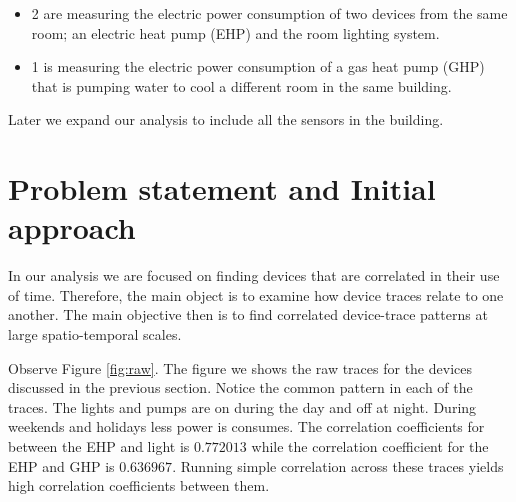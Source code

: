 \begin{itemize}
 \item 2 are measuring the electric power consumption of two devices from the same room; an electric heat 
 		pump (EHP) and the room lighting system.
 \item 1 is measuring the electric power consumption of a gas heat pump (GHP) that is pumping water to cool 
 		a different room in the same building.
\end{itemize}

Later we expand our analysis to include all the sensors in the building.

\section{Problem statement and Initial approach}\label{problem}
In our analysis we are focused on finding devices that are correlated in their use of time.  Therefore, the
main object is to examine how device traces relate to one another.  The main objective then is to find
correlated device-trace patterns at large spatio-temporal scales.  

Observe Figure \ref{fig:raw}.  The figure we shows the raw traces for the devices discussed in the previous section.
Notice the common pattern in each of the traces.  The lights and pumps are on during the day and off at night.
During weekends and holidays less power is consumes.  The correlation coefficients for 
between  the EHP and light is $0.772013$ while the  correlation coefficient for the EHP and GHP is $0.636967$.
Running simple correlation across these traces yields high correlation coefficients between them.



